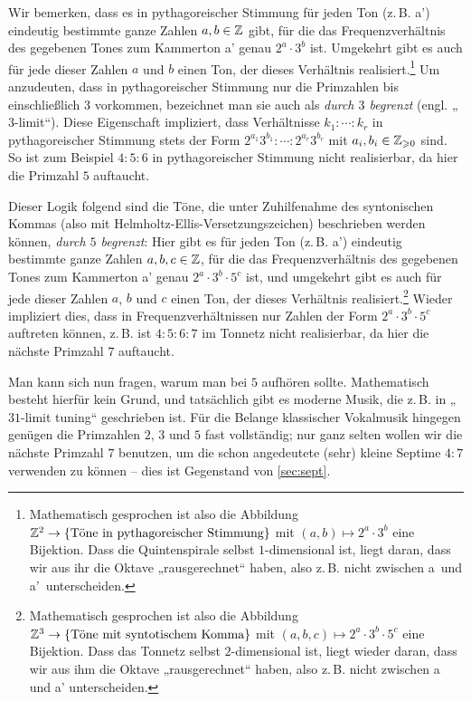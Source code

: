  Wir bemerken, dass es in pythagoreischer
Stimmung für jeden Ton (z.\,B. \flat a’) eindeutig bestimmte ganze Zahlen
$a,b\in \mathbb{Z}$ gibt, für die das Frequenzverhältnis des gegebenen Tones zum
Kammerton a’ genau $2^a\cdot 3^b$ ist. Umgekehrt gibt es auch für jede dieser
Zahlen $a$ und $b$ einen Ton, der dieses Verhältnis
realisiert.\footnote{Mathematisch gesprochen ist also die Abbildung
  $\mathbb{Z}^2\to \{\text{Töne in pythagoreischer Stimmung}\}$ mit
  $(a,b)\mapsto 2^a\cdot 3^b$ eine Bijektion. Dass die Quintenspirale selbst
  $1$-dimensional ist, liegt daran, dass wir aus ihr die Oktave „rausgerechnet“
  haben, also z.\,B. nicht zwischen \flat a\ und \flat a'\ unterscheiden.}  Um
anzudeuten, dass in pythagoreischer Stimmung nur die Primzahlen bis
einschließlich $3$ vorkommen, bezeichnet man sie auch als \emph{durch $3$
  begrenzt} (engl. „$3$-limit“).  Diese Eigenschaft impliziert, dass
Verhältnisse $k_1:\dotsb:k_r$ in pythagoreischer Stimmung stets der Form
$2^{a_1}3^{b_1}:\dotsb:2^{a_r}3^{b_r}$ mit $a_i,b_i\in\mathbb{Z}_{\geqslant 0}$ sind. So ist
zum Beispiel $4:5:6$ in pythagoreischer Stimmung nicht realisierbar, da hier die
Primzahl $5$ auftaucht.

Dieser Logik folgend sind die Töne, die unter Zuhilfenahme des syntonischen
Kommas (also mit Helmholtz-Ellis-Versetzungszeichen) beschrieben werden können,
\emph{durch $5$ begrenzt}: Hier gibt es für jeden Ton (z.\,B. \flatp a')
eindeutig bestimmte ganze Zahlen $a,b,c\in\mathbb{Z}$, für die das Frequenzverhältnis
des gegebenen Tones zum Kammerton a’ genau $2^a\cdot 3^b\cdot 5^c$ ist, und
umgekehrt gibt es auch für jede dieser Zahlen $a$, $b$ und $c$ einen Ton, der
dieses Verhältnis realisiert.\footnote{Mathematisch gesprochen ist also die
  Abbildung $\mathbb{Z}^3\to \{\text{Töne mit syntotischem Komma}\}$ mit
  $(a,b,c)\mapsto 2^a\cdot 3^b\cdot 5^c$ eine Bijektion. Dass das Tonnetz selbst
  $2$-dimensional ist, liegt wieder daran, dass wir aus ihm die Oktave
  „rausgerechnet“ haben, also z.\,B. nicht zwischen \flatp a und \flatp a’
  unterscheiden.} Wieder impliziert dies, dass in Frequenzverhältnissen nur
Zahlen der Form $2^a\cdot 3^b\cdot 5^c$ auftreten können, z.\,B. ist $4:5:6:7$ im Tonnetz
nicht realisierbar, da hier die nächste Primzahl $7$ auftaucht.

Man kann sich nun fragen, warum man bei $5$ aufhören sollte. Mathematisch
besteht hierfür kein Grund, und tatsächlich gibt es moderne Musik, die z.\,B. in
„$31$-limit tuning“ geschrieben ist.  Für die Belange
klassischer Vokalmusik hingegen genügen die Primzahlen $2$, $3$ und $5$ fast
vollständig; nur ganz selten wollen wir die nächste Primzahl $7$ benutzen, um
die schon angedeutete (sehr) kleine Septime $4:7$ verwenden zu können – dies ist
Gegenstand von \cref{sec:sept}.
